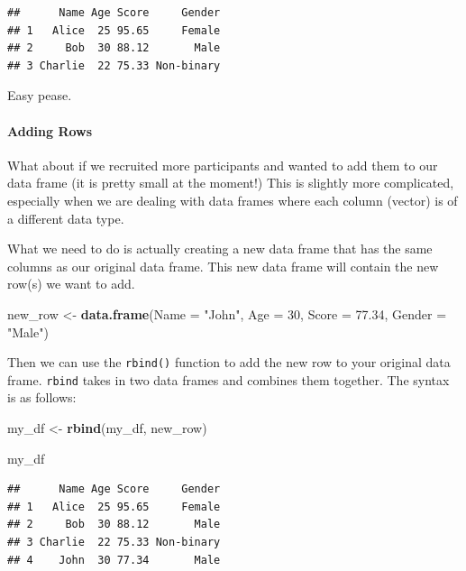 \documentclass[
]{book}
\newenvironment{Shaded}{\begin{snugshade}}{\end{snugshade}}
\newcommand{\AttributeTok}[1]{\textcolor[rgb]{0.13,0.29,0.53}{#1}}
\newcommand{\DecValTok}[1]{\textcolor[rgb]{0.00,0.00,0.81}{#1}}
\newcommand{\FloatTok}[1]{\textcolor[rgb]{0.00,0.00,0.81}{#1}}
\newcommand{\FunctionTok}[1]{\textcolor[rgb]{0.13,0.29,0.53}{\textbf{#1}}}
\newcommand{\NormalTok}[1]{#1}
\newcommand{\OtherTok}[1]{\textcolor[rgb]{0.56,0.35,0.01}{#1}}
\newcommand{\StringTok}[1]{\textcolor[rgb]{0.31,0.60,0.02}{#1}}
\begin{document}
\begin{verbatim}
##      Name Age Score     Gender
## 1   Alice  25 95.65     Female
## 2     Bob  30 88.12       Male
## 3 Charlie  22 75.33 Non-binary
\end{verbatim}

Easy pease.

\hypertarget{adding-rows}{%
\paragraph{Adding Rows}\label{adding-rows}}

What about if we recruited more participants and wanted to add them to our data frame (it is pretty small at the moment!) This is slightly more complicated, especially when we are dealing with data frames where each column (vector) is of a different data type.

What we need to do is actually creating a new data frame that has the same columns as our original data frame. This new data frame will contain the new row(s) we want to add.

\begin{Shaded}
\begin{Highlighting}[]
\NormalTok{new\_row }\OtherTok{\textless{}{-}} \FunctionTok{data.frame}\NormalTok{(}\AttributeTok{Name =} \StringTok{"John"}\NormalTok{, }\AttributeTok{Age =} \DecValTok{30}\NormalTok{, }\AttributeTok{Score =} \FloatTok{77.34}\NormalTok{, }\AttributeTok{Gender =} \StringTok{"Male"}\NormalTok{)}
\end{Highlighting}
\end{Shaded}

Then we can use the \texttt{rbind()} function to add the new row to your original data frame. \texttt{rbind} takes in two data frames and combines them together. The syntax is as follows:

\begin{Shaded}
\begin{Highlighting}[]
\NormalTok{my\_df }\OtherTok{\textless{}{-}} \FunctionTok{rbind}\NormalTok{(my\_df, new\_row)}

\NormalTok{my\_df}
\end{Highlighting}
\end{Shaded}

\begin{verbatim}
##      Name Age Score     Gender
## 1   Alice  25 95.65     Female
## 2     Bob  30 88.12       Male
## 3 Charlie  22 75.33 Non-binary
## 4    John  30 77.34       Male
\end{verbatim}

  
\end{document}
